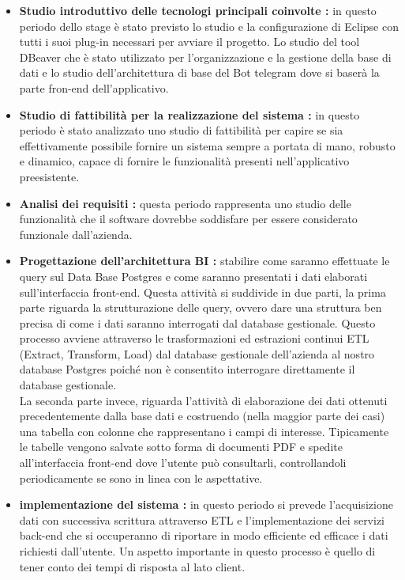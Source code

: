 \begin{itemize}


\item \textbf{Studio introduttivo delle tecnologi principali coinvolte :}
in questo periodo dello stage è stato previsto lo studio e la configurazione di Eclipse con tutti i suoi plug-in necessari per avviare il progetto. Lo studio del tool DBeaver che è stato utilizzato per l'organizzazione e la gestione della base di dati e lo studio dell'architettura di base del Bot telegram dove si baserà la parte fron-end dell'applicativo.

\item \textbf{Studio di fattibilità per la realizzazione del sistema :} in questo periodo è stato analizzato uno studio di fattibilità per capire se sia effettivamente possibile fornire un sistema sempre a portata di mano, robusto e dinamico, capace di fornire le funzionalità  presenti nell'applicativo preesistente.

\item \textbf{Analisi dei requisiti :} questa periodo rappresenta uno studio delle funzionalità che il software dovrebbe soddisfare per essere considerato funzionale dall'azienda. 

\item \textbf{Progettazione dell'architettura BI :} stabilire come saranno effettuate le query sul Data Base Postgres e come saranno presentati i dati elaborati sull'interfaccia front-end. Questa attività si suddivide in due parti, la prima parte riguarda la strutturazione delle query, ovvero dare una struttura ben precisa di come i dati saranno interrogati dal database gestionale. Questo processo avviene attraverso le trasformazioni ed estrazioni continui ETL (Extract, Transform, Load) dal database gestionale dell'azienda al nostro database Postgres poiché non è consentito interrogare direttamente il database gestionale. \\
La seconda parte invece, riguarda l'attività di elaborazione dei dati ottenuti precedentemente dalla base dati e costruendo (nella maggior parte dei casi) una tabella con colonne che rappresentano i campi di interesse. Tipicamente le tabelle vengono salvate sotto forma di documenti PDF e spedite all’interfaccia front-end dove l'utente può consultarli, controllandoli periodicamente se sono in linea con le aspettative. 

\item \textbf{implementazione del sistema :} in questo periodo si prevede l'acquisizione dati con successiva scrittura attraverso ETL e l'implementazione dei servizi back-end che si occuperanno di riportare in modo efficiente ed efficace i dati richiesti dall'utente. Un aspetto importante in questo processo è quello di tener conto dei tempi di risposta al lato client.


\end{itemize}
